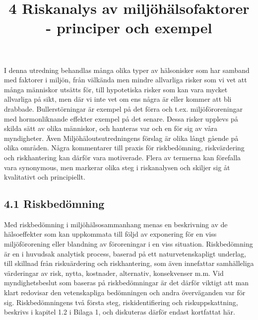 \title{
4 Riskanalys av miljöhälsofaktorer - principer och exempel
}
I denna utredning behandlas många olika typer av hälsonisker som har samband med faktorer i miljön, från välkända men mindre allvarliga risker som vi vet att många människor utsätts för, till hypotetiska risker som kan vara mycket allvarliga på sikt, men där vi inte vet om ens några är eller kommer att bli drabbade. Bullerstörningar är exempel på det förra och t.ex. miljöföroreningar med hormonliknande effekter exempel på det senare. Dessa risker upplevs på skilda sätt av olika människor, och hanteras var och en för sig av våra myndigheter. Även Miljöhäloutsutredningens förslag är olika långt gående på olika områden. Några kommentarer till praxis för riskbedömning, riskvärdering och riskhantering kan därför vara motiverade. Flera av termerna kan förefalla vara synonymous, men markerar olika steg i riskanalysen och skiljer sig åt kvalitativt och principiellt.
\subsection*{4.1 Riskbedömning}
Med riskbedömning i miljöhälsosammanhang menas en beskrivning av de hälsoeffekter som kan uppkommata till följd av exponering för en viss miljöförorening eller blandning av föroreningar i en viss situation. Riskbedömning är en i huvudsak analytisk process, baserad på ett naturvetenskapligt underlag, till skillnad från riskuärdering och riskhantering, som även innefattar samhälleliga värderingar av risk, nytta, kostnader, alternativ, konsekvenser m.m. Vid myndighetsbeslut som baseras på riskbedömningar är det därför viktigt att man klart redovisar den vetenskapliga bedömningen och andra överväganden var för sig.
Riskbedömningens två första steg, riskidentifiering och riskuppskattning, beskrivs i kapitel 1.2 i Bilaga 1, och diskuteras därför endast kortfattat här.

